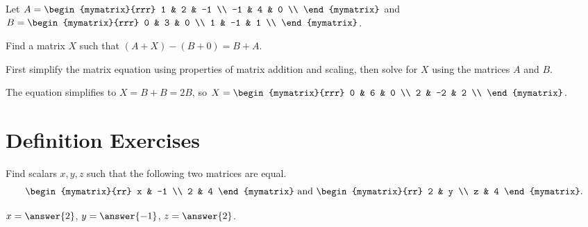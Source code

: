 \documentclass{ximera}
\begin{document}
\begin{ex}
  Let $A = \begin{mymatrix}{rrr}
    1 & 2 & -1 \\
    -1 & 4 & 0 \\
  \end{mymatrix}$ and
  $B = \begin{mymatrix}{rrr}
    0 & 3 & 0 \\
    1 & -1 & 1 \\
  \end{mymatrix}$.\par\noindent
  Find a matrix $X$ such that $(A+X)-(B+0) = B+A$. 
  
  \begin{hint}
    First simplify the matrix equation using properties of matrix addition and scaling, then solve for $X$ using the matrices $A$ and $B$.
  \end{hint}

  \begin{sol}
    The equation simplifies to $X=B+B=2B$, so $X = \begin{mymatrix}{rrr}
    0 & 6 & 0 \\
    2 & -2 & 2 \\
    \end{mymatrix}$.
  \end{sol}
\end{ex}

\section*{Definition Exercises}

\begin{ex}
  Find scalars $x,y,z$ such that the following two matrices are equal.
  \begin{equation*}
    \begin{mymatrix}{rr}
      x & -1 \\
      2 & 4
    \end{mymatrix}
    \quad\mbox{and}\quad
    \begin{mymatrix}{rr}
      2 & y \\
      z & 4
    \end{mymatrix}.
  \end{equation*}
  \begin{sol}
    $x=\answer{2}$, $y=\answer{-1}$, $z=\answer{2}$.
  \end{sol}
\end{ex}
\end{document}
